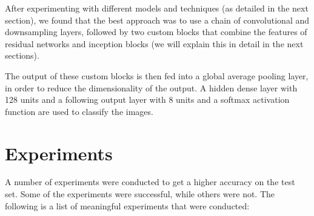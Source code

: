 \documentclass[11pt]{article}
\begin{document}
\begin{multicols}{2}

      After experimenting with different models and techniques (as detailed in
      the next section), we found that the best approach was to use a chain of
      convolutional and downsampling layers, followed by two custom blocks that
      combine the features of residual networks and inception blocks (we will
      explain this in detail in the next sections).

      The output of these custom blocks is then fed into a global average
      pooling layer, in order to reduce the dimensionality of the output. A
      hidden dense layer with 128 units and a following output layer with 8
      units and a softmax activation function are used to classify the images.

      \section{Experiments}


      A number of experiments were conducted to get a higher accuracy on the
      test
      set. Some of the experiments were successful, while others were not. The
      following is a list of meaningful experiments that were conducted:


\end{multicols}
\end{document}
